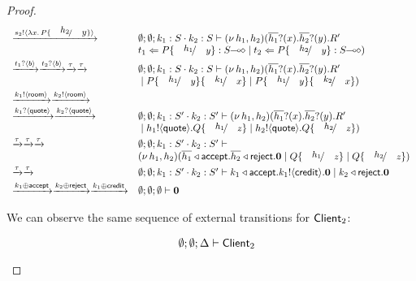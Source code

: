 \begin{proof}
\[\begin{array}{ll}
		\by{\bactout{s_2}{\abs{x}{P \subst{h_2}{y}}}}&
		\es; \es; k_1: S \cat k_2: S \proves \newsp{h_1, h_2}{
		\binp{\dual{h_1}}{x} \binp{\dual{h_2}}{y} R'\\
		& \ftrigger{t_1}{P \subst{h_1}{y}}{\lhot{S}} \Par \ftrigger{t_2}{P \subst{h_2}{y}}{\lhot{S}}}
		\\[1mm]

		\by{\bactinp{t_1}{b}} \by{\bactinp{t_2}{b}} \by{\tau}\by{\tau}&
		\es; \es; k_1: S \cat k_2: S \proves \newsp{h_1, h_2}{
		\binp{\dual{h_1}}{x} \binp{\dual{h_2}}{y} R'\\
		& \Par P\subst{h_1}{y} \subst{k_1}{x} \Par P\subst{h_1}{y} \subst{k_2}{x}}
		\\[1mm]

		\by{\bactout{k_1}{\rtype}} \by{\bactout{k_2}{\rtype}}\\
		\by{\bactinp{k_1}{\Quote}} \by{\bactinp{k_2}{\Quote}}
		& \es; \es; k_1: S' \cat k_2: S' \proves \newsp{h_1, h_2}{
		\binp{\dual{h_1}}{x} \binp{\dual{h_2}}{y} R'\\
		& \Par \bout{h_1}{\Quote} Q \subst{h_1}{z} \Par \bout{h_2}{\Quote} Q \subst{h_2}{z}}
		\\[1mm]

		\by{\tau} \by{\tau} \by{\tau}&
		\es; \es; k_1: S' \cat k_2: S' \proves \\
		& \newsp{h_1, h_2}{\bsel{\dual{h_1}}{\accept} \bsel{\dual{h_2}}{\reject} \inact
		\Par Q \subst{h_1}{z} \Par Q \subst{h_2}{z}}
		\\[1mm]

		\by{\tau} \by{\tau}&
		\es; \es; k_1: S' \cat k_2: S' \proves
		\bsel{k_1}{\accept} \bout{k_1}{\creditc} \inact 
		\Par \bsel{k_2}{\reject} \inact
		\\[1mm]

		\by{\bactsel{k_1}{\accept}} \by{\bactsel{k_2}{\reject}} \by{\bactsel{k_1}{\creditc}}&
		\es; \es; \es \proves \inact
	\end{array}
\]

\noi	We can observe the same sequence of external transitions for $\mathsf{Client}_2$:

\[
	\begin{array}{ll}
		& \emptyset; \emptyset; \Delta \vdash \mathsf{Client}_2
\\[1mm]


\end{array}\]
\end{proof}
